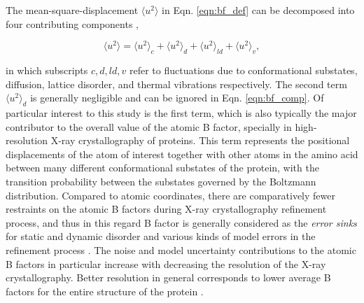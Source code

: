 \documentclass[11pt]{article}
\begin{document}
    The mean-square-displacement $\langle u^2 \rangle$ in Eqn. \ref{eqn:bf_def} can be decomposed into four contributing components \cite{frauenfelder_temperature-dependent_1979},

    \begin{equation}
        \label{eqn:bf_comp}
        \langle u^2 \rangle = \langle u^2 \rangle_c + \langle u^2 \rangle_d + \langle u^2 \rangle_{ld} + \langle u^2 \rangle_v,
    \end {equation}

    \noindent in which subscripts $c, d, ld, v$ refer to fluctuations due to conformational substates, diffusion, lattice disorder, and thermal vibrations respectively. The second term $\langle u^2 \rangle_d$ is generally negligible and can be ignored in Eqn. \ref{eqn:bf_comp}. Of particular interest to this study is the first term, which is also typically the major contributor to the overall value of the atomic B factor, specially in high-resolution X-ray crystallography of proteins. This term represents the positional displacements of the atom of interest together with other atoms in the amino acid between many different conformational substates of the protein, with the transition probability between the substates governed by the Boltzmann distribution. Compared to atomic coordinates, there are comparatively fewer restraints on the atomic B factors during X-ray crystallography refinement process, and thus in this regard B factor is generally considered as the {\it error sinks} for static and dynamic disorder and various kinds of model errors in the refinement process \cite{read_structure-factor_1990}. The noise and model uncertainty contributions to the atomic B factors in particular increase with decreasing the resolution of the X-ray crystallography. Better resolution in general corresponds to lower average B factors for the entire structure of the protein \cite{read_structure-factor_1990}. \\
\end{document}
